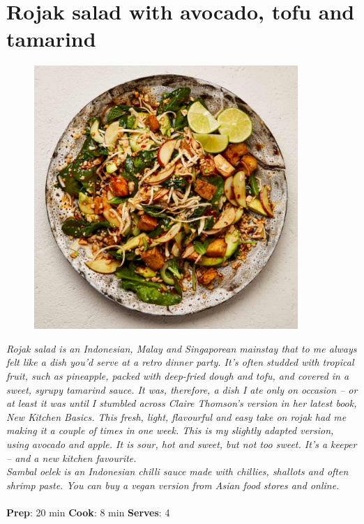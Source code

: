 \documentclass{book}
\begin{document}
\section{Rojak salad with avocado, tofu and tamarind}
\begin{figure}
\centering\includegraphics[width=10cm,height=10cm,keepaspectratio]{Recipe_Pictures/Rojak_salad_with_avocado,_tofu_and_tamarind.png}
\end{figure}
\emph{Rojak salad is an Indonesian, Malay and Singaporean mainstay that to me always felt like a dish you’d serve at a retro dinner party. It’s often studded with tropical fruit, such as pineapple, packed with deep-fried dough and tofu, and covered in a sweet, syrupy tamarind sauce. It was, therefore, a dish I ate only on occasion – or at least it was until I stumbled across Claire Thomson’s version in her latest book, New Kitchen Basics. This fresh, light, flavourful and easy take on rojak had me making it a couple of times in one week. This is my slightly adapted version, using avocado and apple. It is sour, hot and sweet, but not too sweet. It’s a keeper – and a new kitchen favourite.\\ 
Sambal oelek is an Indonesian chilli sauce made with chillies, shallots and often shrimp paste. You can buy a vegan version from Asian food stores and online.}\\\\ 
\textbf{Prep}: 20 min
\textbf{Cook}: 8 min
\textbf{Serves}: 4
\end{document}
